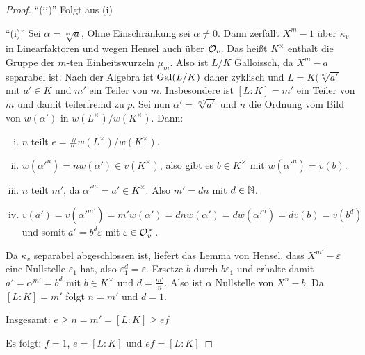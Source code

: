 \begin{proof}
	\enquote{(ii)} Folgt aus (i)
	
	\bigskip \enquote{(i)} Sei $\alpha = \sqrt[m]{a}$, Ohne Einschränkung sei $\alpha \neq 0$.
	Dann zerfällt $X^m-1$ über $\kappa_v$ in Linearfaktoren und wegen Hensel auch über $\mathcal{O}_v$.
	Das heißt $K^\times$ enthalt die Gruppe der $m$-ten Einheitswurzeln $\mu_m$.
	Also ist $L/K$ Galloissch, da $X^m-a$ separabel ist.
	Nach der Algebra ist $\operatorname{Gal}(L/K)$ daher zyklisch und $L=K(\sqrt[m']{a'}$ mit $a'\in K$ und $m'$ ein Teiler von $m$. Insbesondere ist $[L:K] = m'$ ein Teiler von $m$ und damit teilerfremd zu $p$.
	Sei nun $\alpha' = \sqrt[m']{a'}$ und $n$ die Ordnung vom Bild von $w(\alpha')$ in 
	$w(L^\times) / w(K^\times)$. Dann:
	\begin{enumerate}[(i)]
		\item $n$ teilt $e= \# w(L^\times) / w(K^\times)$.
		\item $w(\alpha'^n) = nw(\alpha') \in v(K^\times)$, also gibt es $b\in K^\times$ mit
		$w(\alpha'^n) = v(b)$.
		\item $n$ teilt $m'$, da $\alpha'^m = a' \in K^\times$. Also $m'=dn$ mit $d\in\mathbb{N}$.
		\item $v(a')=v(\alpha'^{m'}) = m'w(\alpha') = dnw(\alpha') = dw(\alpha'^n)
		=dv(b)=v(b^d)$ und somit $a'=b^d \varepsilon$ mit $\varepsilon\in\mathcal{O}_v^\times$.
	\end{enumerate}
	Da $\kappa_v$ separabel abgeschlossen ist, liefert das Lemma von Hensel, dass $X^{m'}-\varepsilon$ eine Nullstelle $\varepsilon_1$ hat, also $\varepsilon_1^d = \varepsilon$.
	Ersetze $b$ durch $b \varepsilon_1$ und erhalte damit $a' = \alpha^{m'} = b^d$ mit $b\in K^\times$ und $d = \frac{m'}{n}$.
	Also ist $\alpha$ Nullstelle von $X^n-b$.
	Da $[L:K] = m'$ folgt $n=m'$ und $d=1$.
	
	\bigskip Insgesamt: $e \geq n = m' = [L:K] \geq ef$
	
	Es folgt: $f=1$, $e=[L:K]$ und $ef = [L:K]$
\end{proof}




















